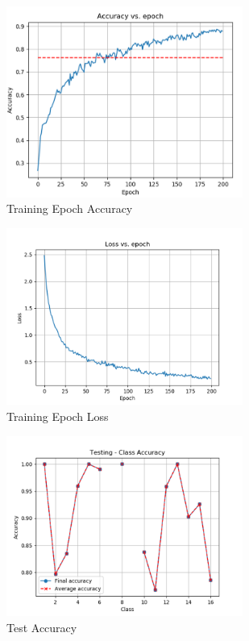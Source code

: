 \documentclass[letterpaper, 10 pt, conference]{ieeeconf}  %
\begin{document}
\begin{figure}[thpb]
      \centering
      \includegraphics[width=220pt]{TrainEpochAccuracy.png}
      \caption{Training Epoch Accuracy}
      \label{figure_TrainEAcc}
   \end{figure}

\begin{figure}[thpb]
      \centering
      \includegraphics[width=220pt]{TrainEpochLoss.png}
      \caption{Training Epoch Loss}
      \label{figure_TrainELoss}
   \end{figure}

\begin{figure}[thpb]
      \centering
      \includegraphics[width=220pt]{TestAccuracy.png}
      \caption{Test Accuracy}
      \label{figure_TestAcc}
   \end{figure}
\end{document}
